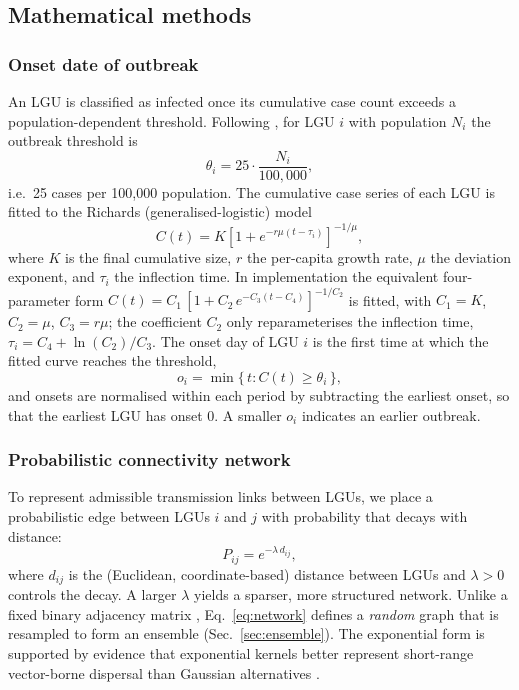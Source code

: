 \documentclass[a4paper,11pt]{article}
\begin{document}
\subsection{Mathematical methods}

\subsubsection{Onset date of outbreak}
An LGU is classified as infected once its cumulative case count exceeds a
population-dependent threshold. Following \cite{Nasution2024}, for LGU $i$ with
population $N_i$ the outbreak threshold is
\begin{equation}
\theta_i = 25 \cdot \frac{N_i}{100{,}000},
\label{eq:threshold}
\end{equation}
i.e.\ 25 cases per 100{,}000 population. The cumulative case series of each LGU is
fitted to the Richards (generalised-logistic) model \cite{Richards1959}
\begin{equation}
C(t) = K\left[1 + e^{-r\mu(t - \tau_i)}\right]^{-1/\mu},
\label{eq:richards}
\end{equation}
where $K$ is the final cumulative size, $r$ the per-capita growth rate, $\mu$ the
deviation exponent, and $\tau_i$ the inflection time. In implementation the
equivalent four-parameter form $C(t)=C_1\,[1+C_2\,e^{-C_3(t-C_4)}]^{-1/C_2}$ is
fitted, with $C_1=K$, $C_2=\mu$, $C_3=r\mu$; the coefficient $C_2$ only reparameterises
the inflection time, $\tau_i = C_4 + \ln(C_2)/C_3$. The onset day of LGU $i$ is
the first time at which the fitted curve reaches the threshold,
\begin{equation}
o_i = \min\{\, t : C(t) \ge \theta_i \,\},
\label{eq:onset}
\end{equation}
and onsets are normalised within each period by subtracting the earliest onset, so
that the earliest LGU has onset $0$. A smaller $o_i$ indicates an earlier
outbreak.

\subsubsection{Probabilistic connectivity network}
To represent admissible transmission links between LGUs, we place a probabilistic
edge between LGUs $i$ and $j$ with probability that decays with distance:
\begin{equation}
P_{ij} = e^{-\lambda\, d_{ij}},
\label{eq:network}
\end{equation}
where $d_{ij}$ is the (Euclidean, coordinate-based) distance between LGUs and
$\lambda>0$ controls the decay. A larger $\lambda$ yields a sparser, more
structured network. Unlike a fixed binary adjacency matrix \cite{Nasution2024},
Eq.~\ref{eq:network} defines a \emph{random} graph that is resampled to form an
ensemble (Sec.~\ref{sec:ensemble}). The exponential form is supported by evidence
that exponential kernels better represent short-range vector-borne dispersal than
Gaussian alternatives \cite{Ng2019,Routledge2021}.
\end{document}
